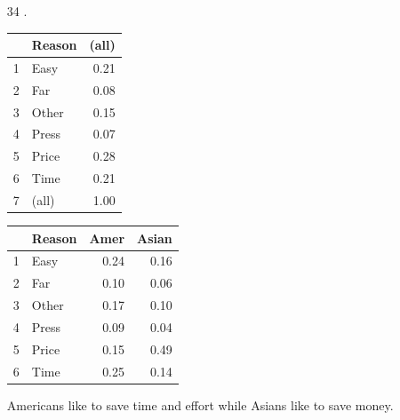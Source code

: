 \documentclass[letterpaper, landscape]{exam}
\begin{document}
\begin{enumerate}
    \item[34].
      \begin{table}[H]
        \centering
        \begin{tabular}{rlr}
          \toprule
                   & Reason & (all) \\
          \midrule
          1        & Easy   & 0.21 \\
          2        & Far    & 0.08 \\
          3        & Other  & 0.15 \\
          4        & Press  & 0.07 \\
          5        & Price  & 0.28 \\
          6        & Time   & 0.21 \\
          7        & (all)  & 1.00 \\
          \bottomrule
        \end{tabular}
      \end{table}

      \begin{table}[H]
        \centering
        \begin{tabular}{rlrr}
          \toprule
                   & Reason & Amer & Asian \\
          \midrule
          1        & Easy   & 0.24 & 0.16 \\
          2        & Far    & 0.10 & 0.06 \\
          3        & Other  & 0.17 & 0.10 \\
          4        & Press  & 0.09 & 0.04 \\
          5        & Price  & 0.15 & 0.49 \\
          6        & Time   & 0.25 & 0.14 \\
          \bottomrule
        \end{tabular}
      \end{table}

      Americans like to save time and effort while Asians like to save money.

  \end{enumerate}
\end{document}
